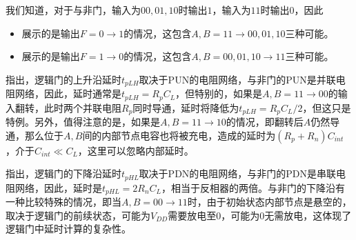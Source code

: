 我们知道，对于与非门，输入为$00,01,10$时输出$1$，输入为$11$时输出$0$，因此\goodbreak
\begin{itemize}
    \item {}展示的是输出$F=0\to 1$的情况，这包含$A,B=11\to 00,01,10$三种可能。
    \item {}展示的是输出$F=1\to 0$的情况，这包含$A,B=00,01,10\to 11$三种可能。
\end{itemize}

指出，逻辑门的上升沿延时$t_{pLH}$取决于PUN的电阻网络，与非门的PUN是并联电阻网络，因此，延时通常是$t_{pLH}=R_pC_L$，但特别的，如果是$A,B=11\to 00$的输入翻转，此时两个并联电阻$R_p$同时导通，延时将降低为$t_{pLH}=R_{p}C_L/2$，但这只是特例。另外，值得注意的是，如果是$A,B=11\to 10$的情况，即翻转后$A$仍然导通，那么位于$A,B$间的内部节点电容也将被充电，造成的延时为$(R_p+R_n)C_{int}$，介于$C_{int}\ll C_L$，这里可以忽略内部延时。

指出，逻辑门的下降沿延时$t_{pHL}$取决于PDN的电阻网络，与非门的PDN是串联电阻网络，因此，延时是$t_{pHL}=2R_nC_L$，相当于反相器的两倍。与非门的下降沿有一种比较特殊的情况，即当$A,B=00\to 11$时，由于初始状态内部节点是悬空的，取决于逻辑门的前续状态，可能为$V_{DD}$需要放电至$0$，可能为$0$无需放电，这体现了逻辑门中延时计算的复杂性。

